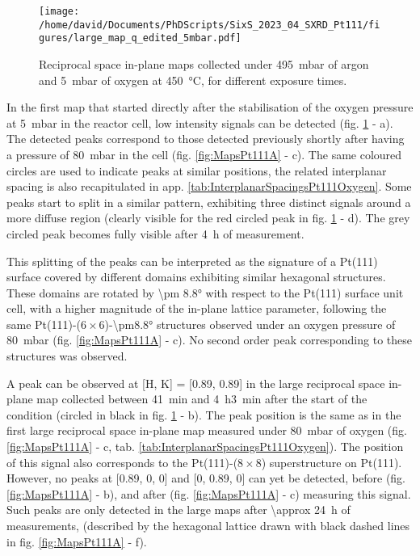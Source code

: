 \begin{figure}[!htb]
    \centering
    \texttt{[image: /home/david/Documents/PhDScripts/SixS\_2023\_04\_SXRD\_Pt111/figures/large\_map\_q\_edited\_5mbar.pdf]}
    \caption{
        Reciprocal space in-plane maps collected under \qty{495}{\milli\bar} of argon and \qty{5}{\milli\bar} of oxygen at \qty{450}{\degreeCelsius}, for different exposure times.
    }
    \label{fig:LargeMapsPt111LowOxygen}
\end{figure}

In the first map that started directly after the stabilisation of the oxygen pressure at \qty{5}{\milli\bar} in the reactor cell, low intensity signals can be detected (fig. \ref{fig:LargeMapsPt111LowOxygen} - a).
The detected peaks correspond to those detected previously shortly after having a pressure of \qty{80}{\milli\bar} in the cell (fig. \ref{fig:MapsPt111A} - c).
The same coloured circles are used to indicate peaks at similar positions, the related interplanar spacing is also recapitulated in app. \ref{tab:InterplanarSpacingsPt111Oxygen}.
Some peaks start to split in a similar pattern, exhibiting three distinct signals around a more diffuse region (clearly visible for the red circled peak in fig. \ref{fig:LargeMapsPt111LowOxygen} - d).
The grey circled peak becomes fully visible after \qty{4}{\hour} of measurement.

This splitting of the peaks can be interpreted as the signature of a Pt(111) surface covered by different domains exhibiting similar hexagonal structures.
These domains are rotated by \ang{\pm 8.8} with respect to the Pt(111) surface unit cell, with a higher magnitude of the in-plane lattice parameter, following the same Pt(111)-($6\times6$)-\ang{\pm8.8} structures observed under an oxygen pressure of \qty{80}{\milli\bar} (fig. \ref{fig:MapsPt111A} - c).
No second order peak corresponding to these structures was observed.

A peak can be observed at [H, K] = [0.89, 0.89] in the large reciprocal space in-plane map collected between \qty{41}{\minute} and \qty{4}{\hour}\qty{3}{\minute} after the start of the condition (circled in black in fig. \ref{fig:LargeMapsPt111LowOxygen} - b).
The peak position is the same as in the first large reciprocal space in-plane map measured under \qty{80}{\milli\bar} of oxygen (fig. \ref{fig:MapsPt111A} - c, tab. \ref{tab:InterplanarSpacingsPt111Oxygen}).
The position of this signal also corresponds to the Pt(111)-($8\times8$) superstructure on Pt(111).
However, no peaks at [0.89, 0, 0] and [0, 0.89, 0] can yet be detected, before (fig. \ref{fig:MapsPt111A} - b), and after (fig. \ref{fig:MapsPt111A} - c) measuring this signal.
Such peaks are only detected in the large maps after \qty{\approx 24}{\hour} of measurements, (described by the hexagonal lattice drawn with black dashed lines in fig. \ref{fig:MapsPt111A} - f).

